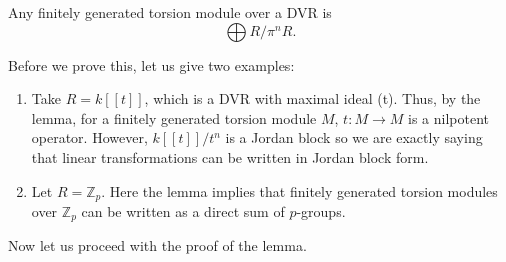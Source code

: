 \begin{lemma} Any finitely generated torsion module over a DVR is
\[\bigoplus R/\pi^nR.\]
\label{dvr fin gen tor module struct}
\end{lemma}
Before we prove this, let us give two examples:
\begin{enumerate}
\item Take $R=k[[t]]$, which is a DVR with maximal ideal (t). Thus, by the lemma, for a finitely generated torsion module $M$, $t:M \to M$ is a nilpotent operator. However, $k[[t]]/t^n$ is a Jordan block so we are exactly saying that linear transformations can be written in Jordan block form.
\item Let $R=\mathbb{Z}_p$. Here the lemma implies that finitely generated torsion modules over $\mathbb{Z}_p$ can be written as a direct sum of $p$-groups. 
\end{enumerate}
Now let us proceed with the proof of the lemma.
